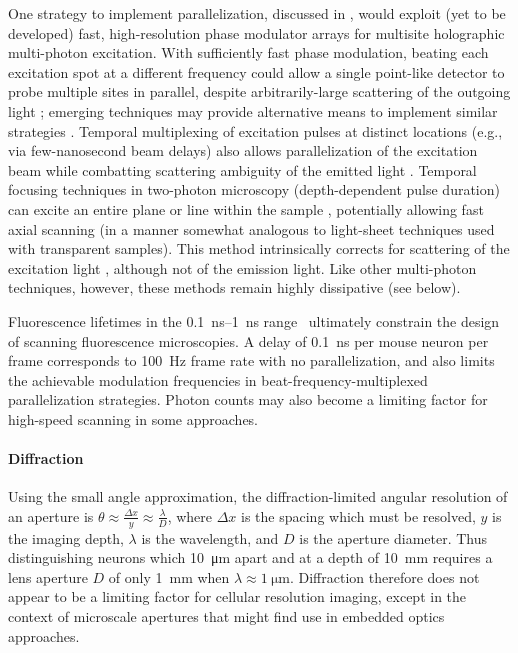 One strategy to implement parallelization, discussed in \cite{alivisatos13}, would exploit (yet to be developed) fast, high-resolution phase modulator arrays for multisite holographic multi-photon excitation. With sufficiently fast phase modulation, beating each excitation spot at a different frequency could allow a single point-like detector to probe multiple sites in parallel, despite arbitrarily-large scattering of the outgoing light \cite{alivisatos13}; emerging techniques may provide alternative means to implement similar strategies \cite{diebold2013digitally}. Temporal multiplexing of excitation pulses at distinct locations (e.g., via few-nanosecond beam delays) also allows parallelization of the excitation beam while combatting scattering ambiguity of the emitted light \cite{cheng2011simultaneous}. Temporal focusing techniques in two-photon microscopy (depth-dependent pulse duration) can excite an entire plane or line within the sample \cite{oron2005scanningless, tal2005improved, sela2013ultra, packer2013targeting}, potentially allowing fast axial scanning (in a manner somewhat analogous to light-sheet techniques used with transparent samples). This method intrinsically corrects for scattering of the excitation light \cite{papagiakoumou2013functional}, although not of the emission light. Like other multi-photon techniques, however, these methods remain highly dissipative (see below).

Fluorescence lifetimes in the \SIrange{0.1}{1}{\nano\second} range~\cite{striker99} ultimately constrain the design of scanning fluorescence microscopies. A delay of \SI{0.1}{\nano\second} per mouse neuron per frame corresponds to \SI{100}{\hertz} frame rate with no parallelization, and also limits the achievable modulation frequencies in beat-frequency-multiplexed parallelization strategies. Photon counts may also become a limiting factor for high-speed scanning in some approaches.

\paragraph{Diffraction}
Using the small angle approximation, the diffraction-limited angular resolution of an aperture is $\theta \approx \frac{\Delta x}{y} \approx \frac{\lambda}{D}$, where $\Delta x$ is the spacing which must be resolved, $y$ is the imaging depth, $\lambda$ is the wavelength, and $D$ is the aperture diameter. Thus distinguishing neurons which \SI{10}{\micro\meter} apart and at a depth of \SI{10}{\milli\meter} requires a lens aperture $D$ of only \SI{1}{\milli\meter} when $\lambda \approx \SI{1}{\micro\meter}$. Diffraction therefore does not appear to be a limiting factor for cellular resolution imaging, except in the context of microscale apertures that might find use in embedded optics approaches.

